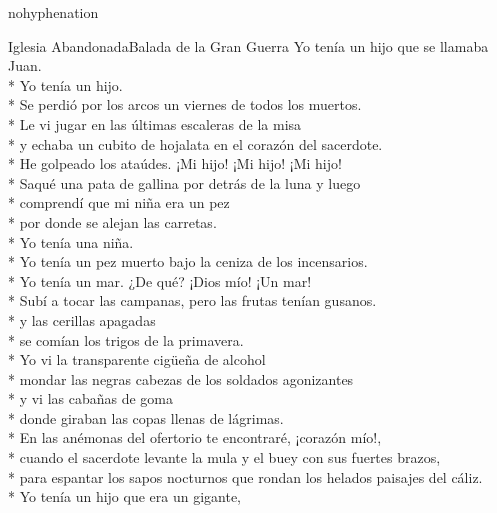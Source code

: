 \documentclass[
    a5paper,
    DIV=10,
    12pt,
    notitlepage,
    oneside,]
{scrbook} %
\begin{document}
\begin{hyphenrules}{nohyphenation}
\begin{poem}{Iglesia Abandonada}{Balada de la Gran Guerra}{}
Yo tenía un hijo que se llamaba Juan.\\*
Yo tenía un hijo.\\*
Se perdió por los arcos un viernes de todos los muertos.\\*
Le vi jugar en las últimas escaleras de la misa\\*
y echaba un cubito de hojalata en el corazón del sacerdote.\\*
He golpeado los ataúdes. ¡Mi hijo! ¡Mi hijo! ¡Mi hijo!\\*
Saqué una pata de gallina por detrás de la luna y luego\\*
comprendí que mi niña era un pez\\*
por donde se alejan las carretas.\\*
Yo tenía una niña.\\*
Yo tenía un pez muerto bajo la ceniza de los incensarios.\\*
Yo tenía un mar. ¿De qué? ¡Dios mío! ¡Un mar!\\*
Subí a tocar las campanas, pero las frutas tenían gusanos.\\*
y las cerillas apagadas\\*
se comían los trigos de la primavera.\\*
Yo vi la transparente cigüeña de alcohol\\*
mondar las negras cabezas de los soldados agonizantes\\*
y vi las cabañas de goma\\*
donde giraban las copas llenas de lágrimas.\\*
En las anémonas del ofertorio te encontraré, ¡corazón mío!,\\*
cuando el sacerdote levante la mula y el buey con sus fuertes brazos,\\*
para espantar los sapos nocturnos que rondan los helados paisajes del
cáliz.\\*
Yo tenía un hijo que era un gigante,\\


\end{poem}
\end{hyphenrules}
\end{document}
